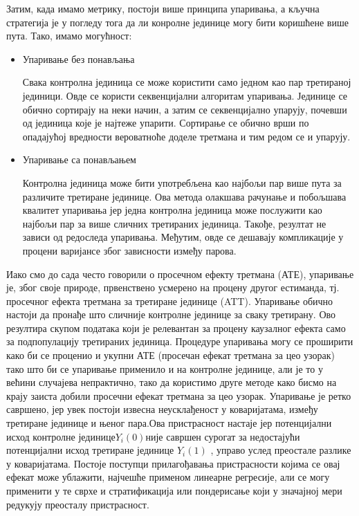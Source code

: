 \documentclass[12pt, a4paper]{article}
\begin{document}
Затим, када имамо метрику, постоји више принципа упаривања, а кључна стратегија је у погледу тога да ли конролне јединице могу бити коришћене више пута. Тако, имамо могућност:
\begin{itemize}
  \item Упаривање без понављања

Свака контролна јединица се може користити само једном као пар третираној јединици. Овде се користи секвенцијални алгоритам упаривања. Јединице се обично сортирају на неки начин, а затим се секвенцијално упарују, почевши од јединица које је најтеже упарити. Сортирање се обично врши по опадајућој вредности вероватноће доделе третмана и тим редом се и упарују.
  \item Упаривање са понављањем

Контролна јединица може бити употребљена као најбољи пар више пута за различите третиране јединице. Ова метода олакшава рачунање и побољшава квалитет упаривања јер једна контролна јединица може послужити као најбољи пар за више сличних третираних јединица. Такође, резултат не зависи од редоследа упаривања. Међутим, овде се дешавају компликације у процени варијансе због зависности између парова.
\end{itemize}
Иако смо до сада често говорили о просечном ефекту третмана (АТЕ), упаривање је, због своје природе, првенствено усмерено на процену другог естиманда, тј. просечног ефекта третмана за третиране јединице (ATT). Упаривање обично настоји да пронађе што сличније контролне јединице за сваку третирану. Ово резултира скупом података који је релевантан за процену каузалног ефекта само за подпопулацију третираних јединица. Процедуре упаривања могу се проширити како би се проценио и укупни АТЕ (просечан ефекат третмана за цео узорак) тако што би се упаривање применило и на контролне јединице, али је то у већини случајева непрактично, тако да користимо друге методе како бисмо на крају заиста добили просечни ефекат третмана за цео узорак. Упаривање је ретко савршено, јер увек постоји извесна неусклађеност у коваријатама, између третиране јединице и њеног пара.Ова пристрасност настаје јер потенцијални исход контролне јединице$ Y_i(0)$није савршен сурогат за недостајући потенцијални исход третиране јединице  $Y_i(1)$ , управо услед преостале разлике у коваријатама. Постоје поступци прилагођавања пристрасности  којима се овај ефекат може ублажити, најчешће применом линеарне регресије, али се могу применити у те сврхе и стратификација или пондерисање који у значајној мери редукују преосталу пристрасност.
\end{document}
